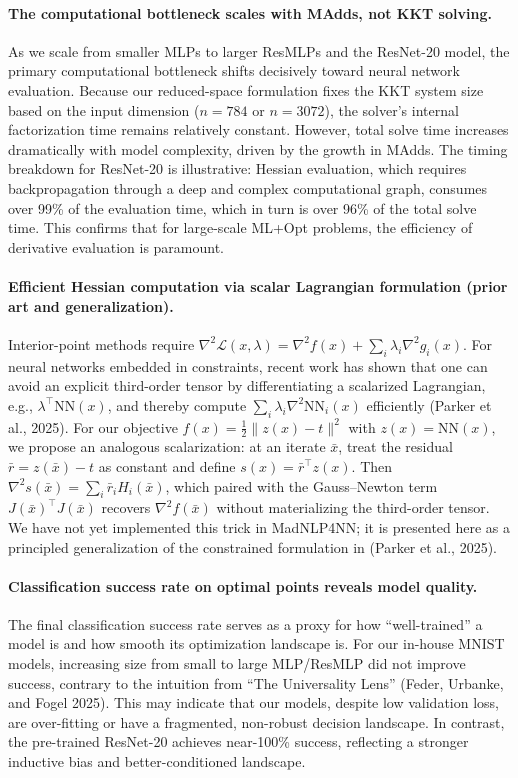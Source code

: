 \documentclass[11pt]{article}
\begin{document}
\paragraph{The computational bottleneck scales with MAdds, not KKT solving.}
As we scale from smaller MLPs to larger ResMLPs and the ResNet-20 model, the primary computational bottleneck shifts decisively toward neural network evaluation. Because our reduced-space formulation fixes the KKT system size based on the input dimension ($n=784$ or $n=3072$), the solver's internal factorization time remains relatively constant. However, total solve time increases dramatically with model complexity, driven by the growth in MAdds. The timing breakdown for ResNet-20 is illustrative: Hessian evaluation, which requires backpropagation through a deep and complex computational graph, consumes over 99\% of the evaluation time, which in turn is over 96\% of the total solve time. This confirms that for large-scale ML+Opt problems, the efficiency of derivative evaluation is paramount.

\paragraph{Efficient Hessian computation via scalar Lagrangian formulation (prior art and generalization).}
Interior-point methods require $\nabla^2 \mathcal{L}(x, \lambda) = \nabla^2 f(x) + \sum_i \lambda_i \nabla^2 g_i(x)$. For neural networks embedded in constraints, recent work has shown that one can avoid an explicit third-order tensor by differentiating a scalarized Lagrangian, e.g., $\lambda^\top \mathrm{NN}(x)$, and thereby compute $\sum_i \lambda_i \nabla^2 \mathrm{NN}_i(x)$ efficiently (Parker et al., 2025). For our objective $f(x)=\tfrac12\|z(x)-t\|^2$ with $z(x)=\mathrm{NN}(x)$, we propose an analogous scalarization: at an iterate $\bar{x}$, treat the residual $\bar{r}=z(\bar{x})-t$ as constant and define $s(x)=\bar{r}^\top z(x)$. Then $\nabla^2 s(\bar{x})=\sum_i \bar{r}_i H_i(\bar{x})$, which paired with the Gauss–Newton term $J(\bar{x})^\top J(\bar{x})$ recovers $\nabla^2 f(\bar{x})$ without materializing the third-order tensor. We have not yet implemented this trick in MadNLP4NN; it is presented here as a principled generalization of the constrained formulation in (Parker et al., 2025).

\paragraph{Classification success rate on optimal points reveals model quality.}
The final classification success rate serves as a proxy for how ``well-trained'' a model is and how smooth its optimization landscape is. For our in-house MNIST models, increasing size from small to large MLP/ResMLP did not improve success, contrary to the intuition from ``The Universality Lens'' (Feder, Urbanke, and Fogel 2025). This may indicate that our models, despite low validation loss, are over-fitting or have a fragmented, non-robust decision landscape. In contrast, the pre-trained ResNet-20 achieves near-100\% success, reflecting a stronger inductive bias and better-conditioned landscape.
\end{document}
